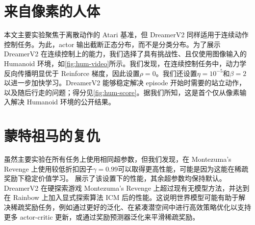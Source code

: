 \section{来自像素的人体}
\label{seq:humanoid}




本文主要实验聚焦于离散动作的 Atari 基准，但 DreamerV2 同样适用于连续动作控制任务。为此，actor 输出截断正态分布，而不是分类分布。为了展示 DreamerV2 在连续控制上的能力，我们选择了具有挑战性、且仅使用图像输入的 Humanoid 环境，如\cref{fig:hum-video}所示。我们发现，在连续控制任务中，动力学反向传播明显优于 Reinforce 梯度，因此设置$\rho=0$。我们还设置$\eta=10^{-5}$和$\beta=2$以进一步加快学习。DreamerV2 能够稳定解决 episode 开始时需要的站立动作，以及随后行走的问题；得分见\cref{fig:hum-score}。据我们所知，这是首个仅从像素输入解决 Humanoid 环境的公开结果。

\clearpage

\section{蒙特祖马的复仇}
\label{seq:montezuma}




虽然主要实验在所有任务上使用相同超参数，但我们发现，在 Montezuma's Revenge 上使用较低折扣因子$\gamma=0.99$可以取得更高性能，可能是因为这能在稀疏奖励下稳定价值学习。 展示了该设置下的性能，其余超参数均保持默认。DreamerV2 在硬探索游戏 Montezuma's Revenge 上超过现有无模型方法，并达到 \citet{taiga2019benchmark} 在 Rainbow 上加入显式探索算法 ICM\citep{pathak2017icm} 后的性能。这说明世界模型可能有助于解决稀疏奖励任务，例如通过更好的泛化、在紧凑潜空间中进行高效策略优化以支持更多 actor-critic 更新，或通过奖励预测器泛化来平滑稀疏奖励。

\clearpage
